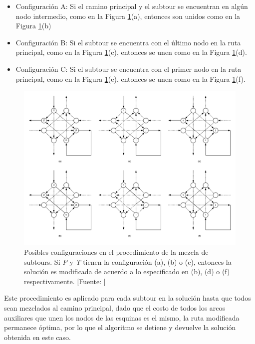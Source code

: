 \begin{itemize}
    \item Configuración A: Si el camino principal y el subtour se encuentran en algún nodo intermedio, como en la Figura \ref{fig:procedimiento_mezcla_subtours}(a), entonces son unidos como en la Figura \ref{fig:procedimiento_mezcla_subtours}(b)
    \item Configuración B: Si el subtour se encuentra con el último nodo en la ruta principal, como en la Figura \ref{fig:procedimiento_mezcla_subtours}(c), entonces se unen como en la Figura \ref{fig:procedimiento_mezcla_subtours}(d).
    \item Configuración C: Si el subtour se encuentra con el primer nodo en la ruta principal, como en la Figura \ref{fig:procedimiento_mezcla_subtours}(e), entonces se unen como en la Figura \ref{fig:procedimiento_mezcla_subtours}(f).
\end{itemize}

\begin{figure}[tbp]
\centerline{\includegraphics[width=\textwidth]{mezcla_subtours.png}}
\caption{Posibles configuraciones en el procedimiento de la mezcla de subtours. Si \textit{P} y \textit{T} tienen la configuración (a), (b) o (c), entonces la solución es modificada de acuerdo a lo especificado en (b), (d) o (f) respectivamente. [Fuente: \citet{Braier2017AnArgentina}]}
\label{fig:procedimiento_mezcla_subtours}
\end{figure}

Este procedimiento es aplicado para cada subtour en la solución hasta que todos sean mezclados al camino principal, dado que el costo de todos los arcos auxiliares que unen los nodos de las esquinas es el mismo, la ruta modificada permanece óptima, por lo que el algoritmo se detiene y devuelve la solución obtenida en este caso.


